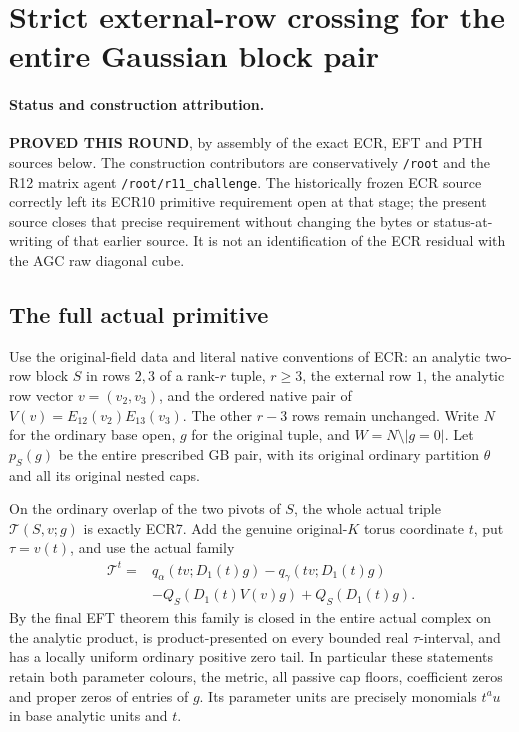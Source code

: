 \section{Strict external-row crossing for the entire Gaussian block pair}
\label{sec:r12-strict-external-gaussian-crossing}

\paragraph{Status and construction attribution.}
\textbf{PROVED THIS ROUND}, by assembly of the exact ECR, EFT and PTH
sources below.  The construction contributors are conservatively
\texttt{/root} and the R12 matrix agent
\texttt{/root/r11\_challenge}.  The historically frozen ECR source
correctly left its ECR10 primitive requirement open at that stage;
the present source closes that precise requirement without changing
the bytes or status-at-writing of that earlier source.  It is not an
identification of the ECR residual with the AGC raw diagonal cube.

\subsection{The full actual primitive}

Use the original-field data and literal native conventions of ECR:
an analytic two-row block $S$ in rows $2,3$ of a rank-$r$ tuple,
$r\ge3$, the external row $1$, the analytic row vector $v=(v_2,v_3)$,
and the ordered native pair of $V(v)=E_{12}(v_2)E_{13}(v_3)$.
The other $r-3$ rows remain unchanged.  Write $N$ for the ordinary
base open, $g$ for the original tuple, and $W=N\setminus|g=0|$.
Let $p_S(g)$ be the entire prescribed GB pair, with its original
ordinary partition $\theta$ and all its original nested caps.

On the ordinary overlap of the two pivots of $S$, the whole actual
triple $\mathcal T(S,v;g)$ is exactly ECR7.  Add the genuine
original-$K$ torus coordinate $t$, put $\tau=v(t)$, and use the
actual family
\[
 \begin{split}
 \mathcal T^t={}&q_\alpha(tv;D_1(t)g)-q_\gamma(tv;D_1(t)g)\\
 &-Q_S(D_1(t)V(v)g)+Q_S(D_1(t)g).
 \end{split}
 \tag{EFC1}
\]
By the final EFT theorem this family is closed in the entire actual
complex on the analytic product, is product-presented on every
bounded real $\tau$-interval, and has a locally uniform ordinary
positive zero tail.  In particular these statements retain both
parameter colours, the metric, all passive cap floors, coefficient
zeros and proper zeros of entries of $g$.  Its parameter units are
precisely monomials $t^a u$ in base analytic units and $t$.

